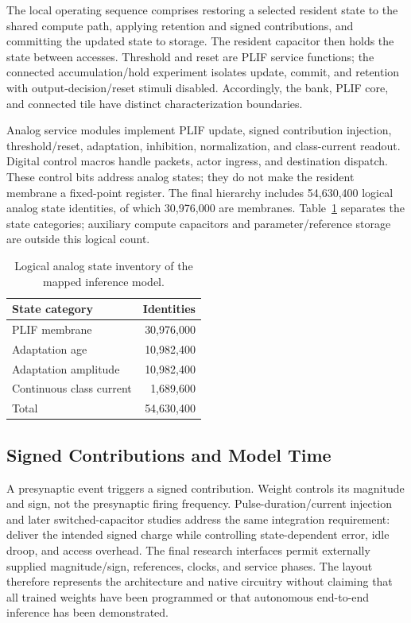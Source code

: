\documentclass[preprint,12pt,number]{elsarticle}
\begin{document}
The local operating sequence comprises restoring a selected resident state to the shared compute path, applying retention and signed contributions, and committing the updated state to storage. The resident capacitor then holds the state between accesses. Threshold and reset are PLIF service functions; the connected accumulation/hold experiment isolates update, commit, and retention with output-decision/reset stimuli disabled. Accordingly, the bank, PLIF core, and connected tile have distinct characterization boundaries.

Analog service modules implement PLIF update, signed contribution injection, threshold/reset, adaptation, inhibition, normalization, and class-current readout. Digital control macros handle packets, actor ingress, and destination dispatch. These control bits address analog states; they do not make the resident membrane a fixed-point register. The final hierarchy includes 54,630,400 logical analog state identities, of which 30,976,000 are membranes. Table~\ref{tab:state_inventory} separates the state categories; auxiliary compute capacitors and parameter/reference storage are outside this logical count.

\begin{table}[t]
\centering\small
\caption{Logical analog state inventory of the mapped inference model.}
\label{tab:state_inventory}
\begin{tabular}{lr}
\toprule
State category & Identities \\
\midrule
PLIF membrane & 30,976,000 \\
Adaptation age & 10,982,400 \\
Adaptation amplitude & 10,982,400 \\
Continuous class current & 1,689,600 \\
\midrule
Total & 54,630,400 \\
\bottomrule
\end{tabular}
\end{table}

\subsection{Signed Contributions and Model Time}
A presynaptic event triggers a signed contribution. Weight controls its magnitude and sign, not the presynaptic firing frequency. Pulse-duration/current injection and later switched-capacitor studies address the same integration requirement: deliver the intended signed charge while controlling state-dependent error, idle droop, and access overhead. The final research interfaces permit externally supplied magnitude/sign, references, clocks, and service phases. The layout therefore represents the architecture and native circuitry without claiming that all trained weights have been programmed or that autonomous end-to-end inference has been demonstrated.
\end{document}
